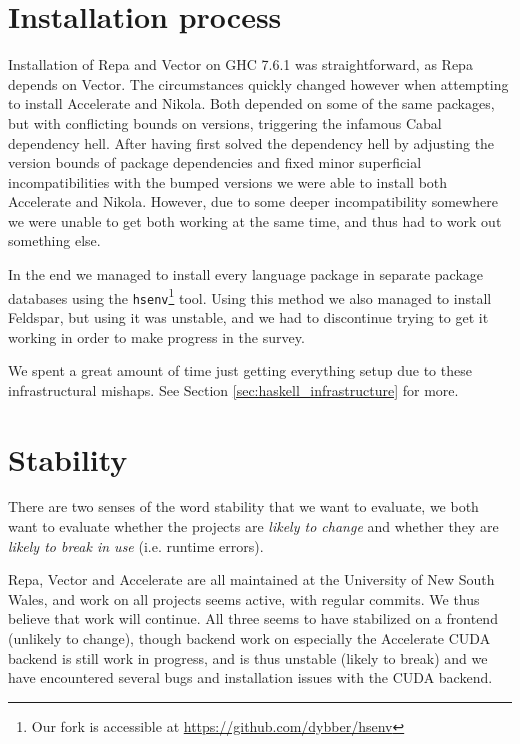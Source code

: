 \section{Installation process}


Installation of Repa and Vector on GHC 7.6.1 was straightforward, as Repa
depends on Vector. The circumstances quickly changed however when attempting
to install Accelerate and Nikola. Both depended on some of the same packages,
but with conflicting bounds on versions, triggering the infamous Cabal
dependency hell. After having first solved the dependency hell by adjusting the
version bounds of package dependencies and fixed minor superficial
incompatibilities with the bumped versions we were able to install both
Accelerate and Nikola. However, due to some deeper incompatibility somewhere we
were unable to get both working at the same time, and thus had to work out
something else.

In the end we managed to install every language package in separate package
databases using the \lstinline{hsenv}\footnote{Our fork is accessible at
\url{https://github.com/dybber/hsenv}} tool.  Using this method we also managed
to install Feldspar, but using it was unstable, and we had to discontinue
trying to get it working in order to make progress in the survey.

We spent a great amount of time just getting everything setup due to these
infrastructural mishaps. See Section \ref{sec:haskell_infrastructure} for more.

\section{Stability}

There are two senses of the word stability that we want to evaluate,
we both want to evaluate whether the projects are \emph{likely to
  change} and whether they are \emph{likely to break in use}
(i.e. runtime errors).

Repa, Vector and Accelerate are all maintained at the University of
New South Wales, and work on all projects seems active, with regular
commits. We thus believe that work will continue. All three seems to
have stabilized on a frontend (unlikely to change), though backend
work on especially the Accelerate CUDA backend is still work in
progress, and is thus unstable (likely to break) and we have
encountered several bugs and installation issues with the CUDA
backend.

